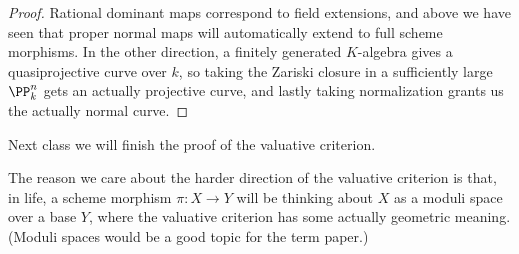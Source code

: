 \documentclass[../notes.tex]{subfiles}
\begin{document}
\begin{proof}
	Rational dominant maps correspond to field extensions, and above we have seen that proper normal maps will automatically extend to full scheme morphisms. In the other direction, a finitely generated $K$-algebra gives a quasiprojective curve over $k$, so taking the Zariski closure in a sufficiently large $\PP^n_k$ gets an actually projective curve, and lastly taking normalization grants us the actually normal curve.
\end{proof}
Next class we will finish the proof of the valuative criterion.
\begin{remark}
	The reason we care about the harder direction of the valuative criterion is that, in life, a scheme morphism $\pi\colon X\to Y$ will be thinking about $X$ as a moduli space over a base $Y$, where the valuative criterion has some actually geometric meaning. (Moduli spaces would be a good topic for the term paper.)
\end{remark}
\end{document}
